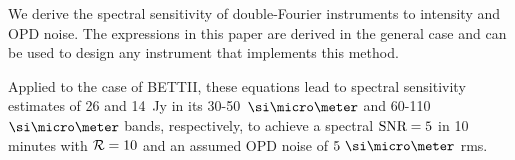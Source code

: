 We derive the spectral sensitivity of double-Fourier instruments to intensity and OPD noise. The expressions in this paper are derived in the general case and can be used to design any instrument that implements this method.

Applied to the case of BETTII, these equations lead to spectral sensitivity estimates of 26 and 14~Jy in its 30-50~$\um$ and 60-110~$\um$ bands, respectively, to achieve a spectral $\textrm{SNR}=5$ in 10 minutes with $\mathcal{R}=10$ and an assumed OPD noise of $5~\um$ rms.




%
%
%
%





